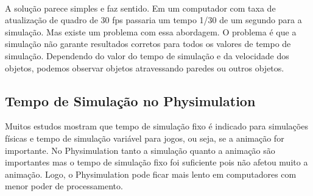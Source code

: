 \ \\
A solução parece simples e faz sentido. Em um computador com taxa de atualização de quadro de 30 fps passaria um tempo 1/30 de um segundo para a simulação.
Mas existe um problema com essa abordagem. O problema é que a simulação não garante resultados corretos para todos os valores de tempo de simulação. 
Dependendo do valor do tempo de simulação e da velocidade dos objetos, podemos observar objetos atravessando paredes ou outros objetos.

\subsection{Tempo de Simulação no Physimulation}

Muitos estudos mostram que tempo de simulação fixo é indicado para simulações físicas e tempo de simulação variável para jogos, ou seja, se a animação for 
importante. No Physimulation tanto a simulação quanto a animação são importantes mas o tempo de simulação fixo foi suficiente pois não afetou muito a animação.
Logo, o Physimulation pode ficar mais lento em computadores com menor poder de processamento.
